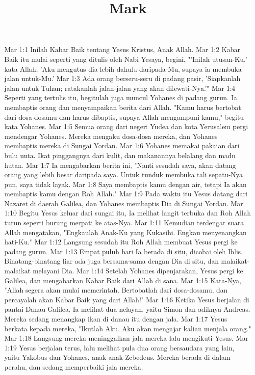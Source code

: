 

\title{Mark}

Mar 1:1  Inilah Kabar Baik tentang Yesus Kristus, Anak Allah.
Mar 1:2  Kabar Baik itu mulai seperti yang ditulis oleh Nabi Yesaya, begini, "'Inilah utusan-Ku,' kata Allah; 'Aku mengutus dia lebih dahulu daripada-Mu, supaya ia membuka jalan untuk-Mu.'
Mar 1:3  Ada orang berseru-seru di padang pasir, 'Siapkanlah jalan untuk Tuhan; ratakanlah jalan-jalan yang akan dilewati-Nya.'"
Mar 1:4  Seperti yang tertulis itu, begitulah juga muncul Yohanes di padang gurun. Ia membaptis orang dan menyampaikan berita dari Allah. "Kamu harus bertobat dari dosa-dosamu dan harus dibaptis, supaya Allah mengampuni kamu," begitu kata Yohanes.
Mar 1:5  Semua orang dari negeri Yudea dan kota Yerusalem pergi mendengar Yohanes. Mereka mengaku dosa-dosa mereka, dan Yohanes membaptis mereka di Sungai Yordan.
Mar 1:6  Yohanes memakai pakaian dari bulu unta. Ikat pinggangnya dari kulit, dan makanannya belalang dan madu hutan.
Mar 1:7  Ia mengabarkan berita ini, "Nanti sesudah saya, akan datang orang yang lebih besar daripada saya. Untuk tunduk membuka tali sepatu-Nya pun, saya tidak layak.
Mar 1:8  Saya membaptis kamu dengan air, tetapi Ia akan membaptis kamu dengan Roh Allah."
Mar 1:9  Pada waktu itu Yesus datang dari Nazaret di daerah Galilea, dan Yohanes membaptis Dia di Sungai Yordan.
Mar 1:10  Begitu Yesus keluar dari sungai itu, Ia melihat langit terbuka dan Roh Allah turun seperti burung merpati ke atas-Nya.
Mar 1:11  Kemudian terdengar suara Allah mengatakan, "Engkaulah Anak-Ku yang Kukasihi. Engkau menyenangkan hati-Ku."
Mar 1:12  Langsung sesudah itu Roh Allah membuat Yesus pergi ke padang gurun.
Mar 1:13  Empat puluh hari Ia berada di situ, dicobai oleh Iblis. Binatang-binatang liar ada juga bersama-sama dengan Dia di situ, dan malaikat-malaikat melayani Dia.
Mar 1:14  Setelah Yohanes dipenjarakan, Yesus pergi ke Galilea, dan mengabarkan Kabar Baik dari Allah di sana.
Mar 1:15  Kata-Nya, "Allah segera akan mulai memerintah. Bertobatlah dari dosa-dosamu, dan percayalah akan Kabar Baik yang dari Allah!"
Mar 1:16  Ketika Yesus berjalan di pantai Danau Galilea, Ia melihat dua nelayan, yaitu Simon dan adiknya Andreas. Mereka sedang menangkap ikan di danau itu dengan jala.
Mar 1:17  Yesus berkata kepada mereka, "Ikutlah Aku. Aku akan mengajar kalian menjala orang."
Mar 1:18  Langsung mereka meninggalkan jala mereka lalu mengikuti Yesus.
Mar 1:19  Yesus berjalan terus, lalu melihat pula dua orang bersaudara yang lain, yaitu Yakobus dan Yohanes, anak-anak Zebedeus. Mereka berada di dalam perahu, dan sedang memperbaiki jala mereka.
